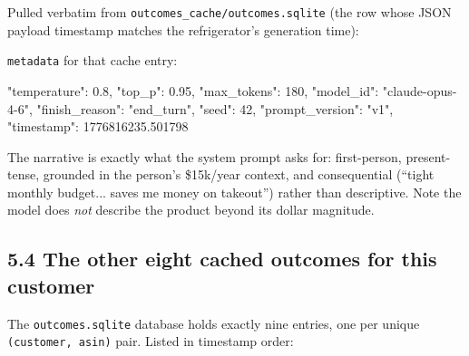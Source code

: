 \documentclass[11pt,a4paper]{article}
\begin{document}
Pulled verbatim from \texttt{outcomes\_cache/outcomes.sqlite} (the row
whose JSON payload timestamp matches the refrigerator's generation
time):


\texttt{metadata} for that cache entry:

\begin{codetiny}
{"temperature": 0.8, "top_p": 0.95, "max_tokens": 180,
 "model_id": "claude-opus-4-6", "finish_reason": "end_turn",
 "seed": 42, "prompt_version": "v1", "timestamp": 1776816235.501798}
\end{codetiny}

The narrative is exactly what the system prompt asks for: first-person,
present-tense, grounded in the person's \$15k/year context, and
consequential (``tight monthly budget... saves me money on takeout'')
rather than descriptive. Note the model does \emph{not} describe the
product beyond its dollar magnitude.

\subsection*{5.4 The other eight cached outcomes for this customer}

The \texttt{outcomes.sqlite} database holds exactly nine entries, one
per unique \texttt{(customer, asin)} pair. Listed in timestamp order:
\end{document}
